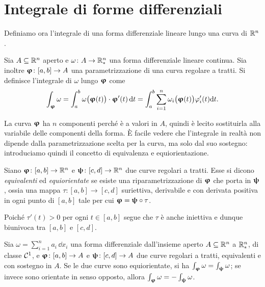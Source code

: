 \section{Integrale di forme differenziali}
Definiamo ora l'integrale di una forma differenziale lineare lungo una curva di $\mathbb{R}^n$.
\begin{definizione} \label{d:integrale-1forma}
	Sia $A\subseteq\mathbb{R}^n$ aperto e $\omega\colon A\to\mathbb{R}^n_*$ una forma differenziale lineare continua.
	Sia inoltre $\bm{\upvarphi}\colon[a,b]\to A$ una parametrizzazione di una curva regolare a tratti.
	Si definisce l'integrale di $\omega$ lungo $\bm{\upvarphi}$ come
	\begin{equation} 
		\int_{\bm{\upvarphi}}\omega=\int_a^b{\omega\big(\bm{\upvarphi}(t)\big)}\cdot{\bm{\upvarphi}'(t)}\,\textup{d} t=\int_a^b\sum_{i=1}^n\omega_i\big(\bm{\upvarphi}(t)\big)\varphi_i'(t)\textup{d} t.
		\label{eq:integrale-1forma}
	\end{equation}
\end{definizione}
	La curva $\bm{\upvarphi}$ ha $n$ componenti perch\'e è a valori in $A$, quindi è lecito sostituirla alla variabile delle componenti della forma.
	È facile vedere che l'integrale in realtà non dipende dalla parametrizzazione scelta per la curva, ma solo dal suo sostegno: introduciamo quindi il concetto di equivalenza e equiorientazione.
\begin{definizione}
	Siano $\bm{\upvarphi}\colon[a,b]\to\mathbb{R}^n$ e $\bm{\uppsi}\colon[c,d]\to\mathbb{R}^n$ due curve regolari a tratti.
	Esse si dicono \emph{equivalenti} ed \emph{equiorientate} se esiste una riparametrizzazione di $\bm{\upvarphi}$ che porta in $\bm{\uppsi}$, ossia una mappa $\tau\colon[a,b]\to[c,d]$ suriettiva, derivabile e con derivata positiva in ogni punto di $[a,b]$ tale per cui $\bm{\upvarphi}=\bm{\uppsi}\circ\tau$.
\end{definizione}
Poiché $\tau'(t)>0$ per ogni $t\in[a,b]$ segue che $\tau$ è anche iniettiva e dunque biunivoca tra $[a,b]$ e $[c,d]$.
\begin{teorema}
	Sia $\omega=\sum_{i=1}^na_i\,\dd x_i$ una forma differenziale dall'insieme aperto $A\subseteq\mathbb{R}^n$ a $\mathbb{R}^n_*$, di classe $\mathcal{C}^{{1}}$, e $\bm{\upvarphi}\colon[a,b]\to A$ e $\bm{\uppsi}\colon [c,d]\to A$ due curve regolari a tratti, equivalenti e con sostegno in $A$.
	Se le due curve sono equiorientate, si ha $\int_{\bm{\upvarphi}}\omega=\int_{\bm{\uppsi}}\omega$; se invece sono orientate in senso opposto, allora $\int_{\bm{\upvarphi}}\omega=-\int_{\bm{\uppsi}}\omega$.
\end{teorema}
